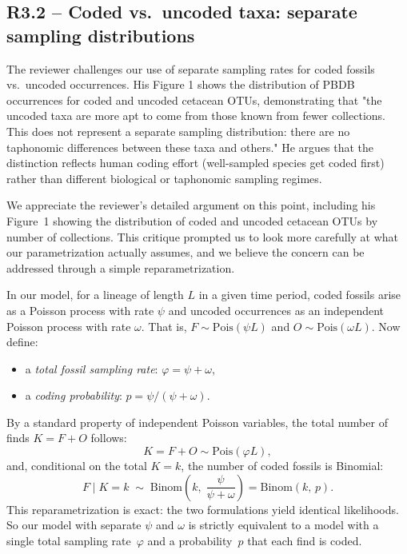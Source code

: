 \documentclass[11pt]{article}
\newcommand{\response}[1]{\noindent\textcolor{resp}{#1}\medskip}
\begin{document}
\subsection*{R3.2 -- Coded vs.\ uncoded taxa: separate sampling distributions}

The reviewer challenges our use of separate sampling rates for coded fossils vs.\ uncoded occurrences. His Figure 1 shows the distribution of PBDB occurrences for coded and uncoded cetacean OTUs, demonstrating that "the uncoded taxa are more apt to come from those known from fewer collections. This does not represent a separate sampling distribution: there are no taphonomic differences between these taxa and others." He argues that the distinction reflects human coding effort (well-sampled species get coded first) rather than different biological or taphonomic sampling regimes.

\response{We appreciate the reviewer's detailed argument on this point, including his Figure~1 showing the distribution of coded and uncoded cetacean OTUs by number of collections. This critique prompted us to look more carefully at what our parametrization actually assumes, and we believe the concern can be addressed through a simple reparametrization.}

\response{In our model, for a lineage of length $L$ in a given time period, coded fossils arise as a Poisson process with rate $\psi$ and uncoded occurrences as an independent Poisson process with rate $\omega$. That is, $F \sim \text{Pois}(\psi L)$ and $O \sim \text{Pois}(\omega L)$. Now define:
\begin{itemize}[nosep]
    \item a \emph{total fossil sampling rate}: $\varphi = \psi + \omega$,
    \item a \emph{coding probability}: $p = \psi / (\psi + \omega)$.
\end{itemize}
By a standard property of independent Poisson variables, the total number of finds $K = F + O$ follows:
\[
K = F + O \sim \text{Pois}(\varphi L),
\]
and, conditional on the total $K = k$, the number of coded fossils is Binomial:
\[
F \mid K = k \;\sim\; \text{Binom}\!\left(k,\; \frac{\psi}{\psi + \omega}\right) = \text{Binom}(k, \, p).
\]
This reparametrization is exact: the two formulations yield identical likelihoods. So our model with separate $\psi$ and $\omega$ is strictly equivalent to a model with a single total sampling rate~$\varphi$ and a probability~$p$ that each find is coded.}
\end{document}
